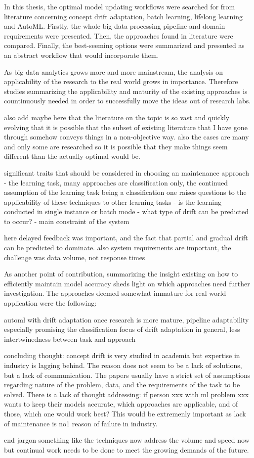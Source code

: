 In this thesis, the optimal model updating workflows were searched for from literature concerning concept drift adaptation, batch learning, lifelong learning and AutoML. Firstly, the whole big data processing pipeline and domain requirements were presented. Then, the approaches found in literature were compared. Finally, the best-seeming options were summarized and presented as an abstract workflow that would incorporate them.

As big data analytics grows more and more mainstream, the analysis on applicability of the research to the real world grows in importance. Therefore studies summarizing the applicability and maturity of the existing approaches is countinuously needed in order to successfully move the ideas out of research labs.


also add maybe here that the literature on the topic is so vast and quickly evolving that it is possible that the subset of existing literature that I have gone through somehow conveys things in a non-objective way. also the cases are many and only some are researched so it is possible that they make things seem different than the actually optimal would be.

significant traits that should be considered in choosing an maintenance approach
 - the learning task, many approaches are classification only, the continued assumption of the learning task being a classification one raises questions to the applicability of these techniques to other learning tasks
 - is the learning conducted in single instance or batch mode
 - what type of drift can be predicted to occur?
 - main constraint of the system
 
 here delayed feedback was important, and the fact that partial and gradual drift can be predicted to dominate. also system requirements are important, the challenge was data volume, not response times
 
 As another point of contribution, summarizing the insight existing on how to efficiently maintain model accuracy sheds light on which approaches need further investigation. The approaches deemed somewhat immature for real world application were the following:
 
 automl with drift adaptation once research is more mature, pipeline adaptability especially promising
 the classification focus of drift adaptation in general, less intertwinedness between task and approach
 
 concluding thought: concept drift is very studied in academia but expertise in industry is lagging behind. The reason does not seem to be a lack of solutions, but a lack of communication. The papers usually have a strict set of assumptions regarding nature of the problem, data, and the requirements of the task to be solved. There is a lack of thought addressing: if person xxx with ml problem xxx wants to keep their models accurate, which approaches are applicable, and of those, which one would work best? This would be extremenly important as lack of maintenance is no1 reason of failure in industry.
 
 end jargon something like the techniques now address the volume and speed now but continual work needs to be done to meet the growing demands of the future.
